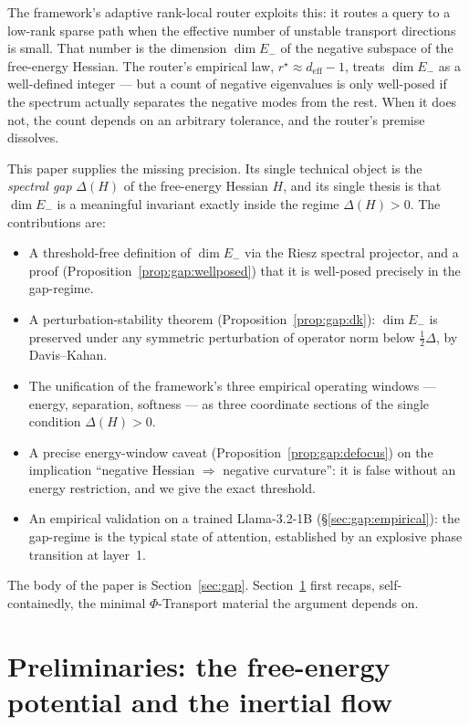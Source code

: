 \documentclass[11pt]{article}
\theoremstyle{plain}
\theoremstyle{definition}
\begin{document}
The framework's adaptive rank-local router exploits this: it routes a
query to a low-rank sparse path when the effective number of unstable
transport directions is small. That number is the dimension $\dim E_-$ of
the negative subspace of the free-energy Hessian. The router's empirical
law, $r^\star\approx d_{\mathrm{eff}}-1$, treats $\dim E_-$ as a
well-defined integer --- but a count of negative eigenvalues is only
well-posed if the spectrum actually separates the negative modes from the
rest. When it does not, the count depends on an arbitrary tolerance, and
the router's premise dissolves.

This paper supplies the missing precision. Its single technical object is
the \emph{spectral gap} $\Delta(H)$ of the free-energy Hessian
$H$, and its single thesis is that $\dim E_-$ is a meaningful invariant
exactly inside the regime $\Delta(H)>0$. The contributions are:
\begin{itemize}
  \item A threshold-free definition of $\dim E_-$ via the Riesz spectral
    projector, and a proof (Proposition~\ref{prop:gap:wellposed}) that it
    is well-posed precisely in the gap-regime.
  \item A perturbation-stability theorem
    (Proposition~\ref{prop:gap:dk}): $\dim E_-$ is preserved under any
    symmetric perturbation of operator norm below $\tfrac12\Delta$, by
    Davis--Kahan.
  \item The unification of the framework's three empirical operating
    windows --- energy, separation, softness --- as three coordinate
    sections of the single condition $\Delta(H)>0$.
  \item A precise energy-window caveat
    (Proposition~\ref{prop:gap:defocus}) on the implication
    ``negative Hessian $\Rightarrow$ negative curvature'': it is false
    without an energy restriction, and we give the exact threshold.
  \item An empirical validation on a trained Llama-3.2-1B
    (\S\ref{sec:gap:empirical}): the gap-regime is the typical state of
    attention, established by an explosive phase transition at layer~1.
\end{itemize}

The body of the paper is Section~\ref{sec:gap}. Section~\ref{sec:prelim}
first recaps, self-containedly, the minimal $\Phi$-Transport material the
argument depends on.

\section{Preliminaries: the free-energy potential and the inertial flow}
\label{sec:prelim}
\end{document}
